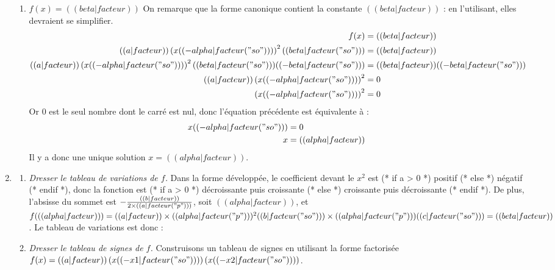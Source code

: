 \begin{enumerate}
\begin{enumerate}
\item $f(x)=(( beta|facteur ))$ On remarque que la forme canonique contient la constante $(( beta|facteur ))$ : en l'utilisant, elles devraient se simplifier.
\begin{align*}
f(x) &= (( beta|facteur)) \\
(( a|facteur )) \left( x (( -alpha|facteur("so") )) \right)^2 (( beta|facteur("so") )) &= (( beta|facteur ))\\
(( a|facteur )) \left( x (( -alpha|facteur("so") )) \right)^2 (( beta|facteur("so") )) (( -beta|facteur("so") )) &= (( beta|facteur )) (( -beta|facteur("so") ))\\
(( a|facteur )) \left( x (( -alpha|facteur("so") )) \right)^2 &= 0\\
\left( x (( -alpha|facteur("so") )) \right)^2 &= 0\\
\end{align*}
Or $0$ est le seul nombre dont le carré est nul, donc l'équation précédente est équivalente à :
\begin{align*}
x (( -alpha|facteur("so") )) &= 0\\
x &= (( alpha|facteur )) \\
\end{align*}
Il y a donc une unique solution $x=(( alpha|facteur ))$.
\end{enumerate}
\item
\begin{enumerate}
\item \emph{Dresser le tableau de variations de $f$.} Dans la forme développée, le coefficient devant le $x^2$ est 
(* if a > 0 *) positif (* else *) négatif (* endif *),
donc la fonction est 
(* if a > 0 *) décroissante puis croissante (* else *) croissante puis décroissante (* endif *).
De plus, l'absisse du sommet est $-\frac{(( b|facteur ))}{2\times(( a|facteur("p") ))}$, soit $(( alpha|facteur ))$, et
$f( (( alpha|facteur )) )=(( a|facteur ))\times(( alpha|facteur("p") ))^2 (( b|facteur("so") ))\times (( alpha|facteur("p") )) (( c|facteur("so") ))=(( beta|facteur ))$.
Le tableau de variations est donc :
\begin{center}
\end{center}
\item \emph{Dresser le tableau de signes de $f$.} Construisons un tableau de signes en utilisant la forme factorisée $f(x)=(( a|facteur )) \left(x (( -x1|facteur("so") ))\right) \left(x (( -x2|facteur("so") ))\right)$.


\end{enumerate}
\end{enumerate}
